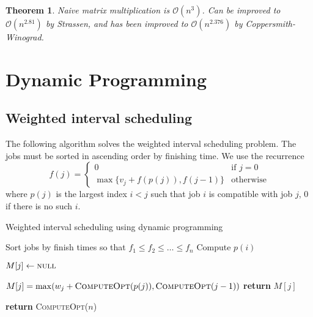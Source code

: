 \documentclass[10pt, oneside, reqno]{amsart}
\theoremstyle{plain}%
\newtheorem{thm}{Theorem}[section]
\theoremstyle{definition}
\theoremstyle{remark}
\newcommand{\bigo}[1]{\mathcal{O}(#1)}
\begin{document}
\begin{thm}
    Naive matrix multiplication is $\bigo{n^3}$.  Can be improved to $\bigo{n^{2.81}}$ by Strassen, and has been improved to $\bigo{n^{2.376}}$ by Coppersmith-Winograd.
\end{thm}




\section{Dynamic Programming} %
\label{sec:dynamic_programming}


\subsection{Weighted interval scheduling} %
\label{sub:weighted_interval_scheduling}
The following algorithm solves the weighted interval scheduling problem.
The jobs must be sorted in ascending order by finishing time.
We use the recurrence \[
    f(j) = \begin{cases}
        0 &\text{if $j = 0$} \\
        \max \{v_j + f(p(j)), f(j-1) \} &\text{otherwise}
    \end{cases}
\] where $p(j)$ is the largest index $i < j$ such that job $i$ is compatible with job $j$, $0$ if there is no such $i$.

\begin{algorithm}[H]
    \label{alg:dynamic_rising_trend}
    \caption{Weighted interval scheduling using dynamic programming}
    \begin{algorithmic}[1]
            \State Sort jobs by finish times so that $f_1 \leq f_2 \leq \dots \leq f_n$
            \State Compute $p(i)$ 
            \EndFor
            
            \State
            
                \State $M[j] \gets \textsc{null}$
            \EndFor 
                
                \State $M[j] = \max(w_j + \textsc{ComputeOpt}(p(j)), \textsc{ComputeOpt}(j-1))$
            \EndIf
            \State \textbf{return} $M[j]$
            \EndProcedure
            
        \State \textbf{return} \textsc{ComputeOpt}($n$)
        \EndProcedure
    \end{algorithmic}
\end{algorithm}
\end{document}

